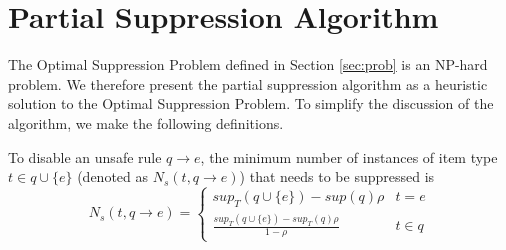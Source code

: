  \section{Partial Suppression Algorithm}
\label{sec:algo}

\renewcommand{\algorithmicforall}{\textbf{for each}}

The Optimal Suppression Problem defined in Section \ref{sec:prob} is
an NP-hard problem.
We therefore present the partial suppression algorithm as a
heuristic solution to the Optimal Suppression Problem.
To simplify the discussion of the algorithm, we make the following
definitions.
%
\begin{lemma}
\label{minimum}
To disable an unsafe rule $q \rightarrow e$, the minimum number of instances
of item type $t \in q\cup\{e\}$ (denoted as $N_s(t, q\rightarrow e)$) 
that needs to be suppressed is
\begin{equation}\label{eq:N_s}N_s(t, q\rightarrow e)=
\begin{cases}
sup_T(q\cup \{e\})-sup(q)\rho & t=e  \\
\frac{sup_T(q\cup \{e\})-sup_T(q)\rho}{1-\rho} & t\in q %
\end{cases}
\end{equation}
\end{lemma}

